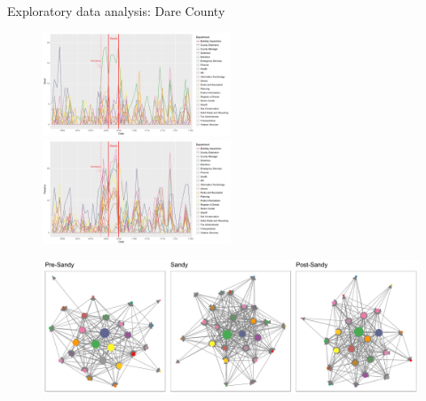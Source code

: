 \documentclass[10pt, xcolor=table]{beamer}
\theoremstyle{definition}
\theoremstyle{remark}
\begin{document}
\begin{frame}{Exploratory data analysis: Dare County}
	\begin{minipage}{0.85\linewidth}
	 	 \begin{figure}
	 	 	\includegraphics[width=0.5\textwidth, trim = 0cm 0cm 6cm 0cm, clip=true]{figures/DareSend.pdf}	 	
	 	 	\includegraphics[width=0.5\textwidth, trim = 0cm 0cm 6cm 0cm, clip=true]{figures/DareReceive.pdf}
	 	 \end{figure}	\vspace{-.5cm}
	 \begin{figure}
	 		 	\includegraphics[width=1\textwidth]{figures/DareNetwork.pdf}
	 		 		 \end{figure}	
\end{minipage}
\begin{minipage}{0.13\linewidth}
		 \begin{figure}

\end{figure}
\end{minipage}
\end{frame}
\end{document}
